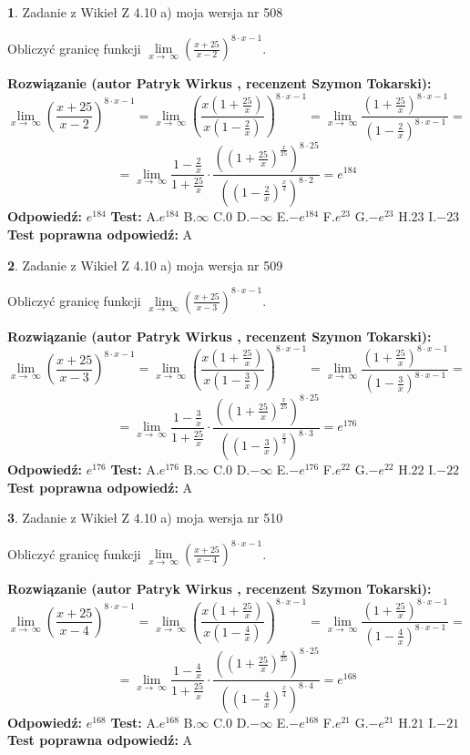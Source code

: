 \documentclass[12pt, a4paper]{article}
\theoremstyle{definition} %
\newtheorem{zad}{}
\newcommand{\zadStart}[1]{\begin{zad}#1\newline}
\newcommand{\zadStop}{\end{zad}}
\newcommand{\rozwStart}[2]{\noindent \textbf{Rozwiązanie (autor #1 , recenzent #2): }\newline}
\newcommand{\rozwStop}{\newline}
\newcommand{\odpStart}{\noindent \textbf{Odpowiedź:}\newline}
\newcommand{\odpStop}{\newline}
\newcommand{\testStart}{\noindent \textbf{Test:}\newline}
\newcommand{\testStop}{\newline}
\newcommand{\kluczStart}{\noindent \textbf{Test poprawna odpowiedź:}\newline}
\newcommand{\kluczStop}{\newline}
\begin{document}
\zadStart{Zadanie z Wikieł Z 4.10 a) moja wersja nr 508}

Obliczyć granicę funkcji  $\lim\limits_{x\to\ \infty}(\frac{x+25}{x-2})^{8\cdot x-1}$.
\zadStop
\rozwStart{Patryk Wirkus}{Szymon Tokarski}
$$\lim\limits_{x\to\ \infty}(\frac{x+25}{x-2})^{8\cdot x-1} = \lim\limits_{x\to\ \infty}(\frac{x(1+\frac{25}{x})}{x(1-\frac{2}{x})})^{8\cdot x-1}=\lim\limits_{x\to\ \infty}\frac{(1+\frac{25}{x})^{8\cdot x-1}}{(1-\frac{2}{x})^{8\cdot x-1}}=$$
$$=\lim\limits_{x\to\ \infty}\frac{1-\frac{2}{x}}{1+\frac{25}{x}}\cdot\frac{((1+\frac{25}{x})^{\frac{x}{25}})^{8\cdot25}}{((1-\frac{2}{x})^{\frac{x}{2}})^{8\cdot2}}=e^{184}$$
\rozwStop
\odpStart
$e^{184}$
\odpStop
\testStart
A.$e^{184}$ B.$\infty$ C.$0$ D.$-\infty$ E.$-e^{184}$
F.$e^{23}$ G.$-e^{23}$
H.$23$
I.$-23$
\testStop
\kluczStart
A
\kluczStop



\zadStart{Zadanie z Wikieł Z 4.10 a) moja wersja nr 509}

Obliczyć granicę funkcji  $\lim\limits_{x\to\ \infty}(\frac{x+25}{x-3})^{8\cdot x-1}$.
\zadStop
\rozwStart{Patryk Wirkus}{Szymon Tokarski}
$$\lim\limits_{x\to\ \infty}(\frac{x+25}{x-3})^{8\cdot x-1} = \lim\limits_{x\to\ \infty}(\frac{x(1+\frac{25}{x})}{x(1-\frac{3}{x})})^{8\cdot x-1}=\lim\limits_{x\to\ \infty}\frac{(1+\frac{25}{x})^{8\cdot x-1}}{(1-\frac{3}{x})^{8\cdot x-1}}=$$
$$=\lim\limits_{x\to\ \infty}\frac{1-\frac{3}{x}}{1+\frac{25}{x}}\cdot\frac{((1+\frac{25}{x})^{\frac{x}{25}})^{8\cdot25}}{((1-\frac{3}{x})^{\frac{x}{3}})^{8\cdot3}}=e^{176}$$
\rozwStop
\odpStart
$e^{176}$
\odpStop
\testStart
A.$e^{176}$ B.$\infty$ C.$0$ D.$-\infty$ E.$-e^{176}$
F.$e^{22}$ G.$-e^{22}$
H.$22$
I.$-22$
\testStop
\kluczStart
A
\kluczStop



\zadStart{Zadanie z Wikieł Z 4.10 a) moja wersja nr 510}

Obliczyć granicę funkcji  $\lim\limits_{x\to\ \infty}(\frac{x+25}{x-4})^{8\cdot x-1}$.
\zadStop
\rozwStart{Patryk Wirkus}{Szymon Tokarski}
$$\lim\limits_{x\to\ \infty}(\frac{x+25}{x-4})^{8\cdot x-1} = \lim\limits_{x\to\ \infty}(\frac{x(1+\frac{25}{x})}{x(1-\frac{4}{x})})^{8\cdot x-1}=\lim\limits_{x\to\ \infty}\frac{(1+\frac{25}{x})^{8\cdot x-1}}{(1-\frac{4}{x})^{8\cdot x-1}}=$$
$$=\lim\limits_{x\to\ \infty}\frac{1-\frac{4}{x}}{1+\frac{25}{x}}\cdot\frac{((1+\frac{25}{x})^{\frac{x}{25}})^{8\cdot25}}{((1-\frac{4}{x})^{\frac{x}{4}})^{8\cdot4}}=e^{168}$$
\rozwStop
\odpStart
$e^{168}$
\odpStop
\testStart
A.$e^{168}$ B.$\infty$ C.$0$ D.$-\infty$ E.$-e^{168}$
F.$e^{21}$ G.$-e^{21}$
H.$21$
I.$-21$
\testStop
\kluczStart
A
\kluczStop
\end{document}
